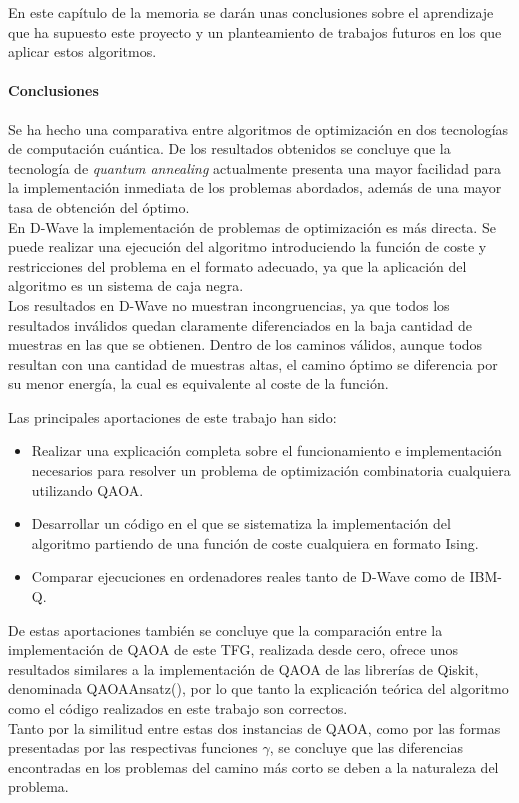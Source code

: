 En este capítulo de la memoria se darán unas conclusiones sobre el aprendizaje que ha supuesto este proyecto y un planteamiento de trabajos futuros en los que aplicar estos algoritmos.

\paragraph{Conclusiones}
Se ha hecho una comparativa entre algoritmos de optimización en dos tecnologías de computación cuántica.
De los resultados obtenidos se concluye que la tecnología de \textit{quantum annealing} actualmente presenta una mayor facilidad para la implementación inmediata de los problemas abordados, además de una mayor tasa de obtención del óptimo.
\\
En D-Wave la implementación de problemas de optimización es más directa.
Se puede realizar una ejecución del algoritmo introduciendo la función de coste y restricciones del problema en el formato adecuado, ya que la aplicación del algoritmo es un sistema de caja negra.
\\
Los resultados en D-Wave no muestran incongruencias, ya que todos los resultados inválidos quedan claramente diferenciados en la baja cantidad de muestras en las que se obtienen.
Dentro de los caminos válidos, aunque todos resultan con una cantidad de muestras altas, el camino óptimo se diferencia por su menor energía, la cual es equivalente al coste de la función.

Las principales aportaciones de este trabajo han sido:

\begin{itemize}
\item Realizar una explicación completa sobre el funcionamiento e implementación necesarios para resolver un problema de optimización combinatoria cualquiera utilizando QAOA\@.
  
\item Desarrollar un código en el que se sistematiza la implementación del algoritmo partiendo de una función de coste cualquiera en formato Ising.

\item Comparar ejecuciones en ordenadores reales tanto de D-Wave como de IBM-Q.
\end{itemize}

De estas aportaciones también se concluye que la comparación entre la implementación de QAOA de este TFG, realizada desde cero, ofrece unos resultados similares a la implementación de QAOA de las librerías de Qiskit, denominada QAOAAnsatz(), por lo que tanto la explicación teórica del algoritmo como el código realizados en este trabajo son correctos.
\\
Tanto por la similitud entre estas dos instancias de QAOA, como por las formas presentadas por las respectivas funciones $\gamma$, se concluye que las diferencias encontradas en los problemas del camino más corto se deben a la naturaleza del problema.

